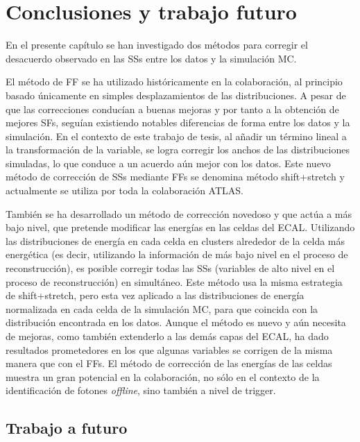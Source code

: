 \section{Conclusiones y trabajo futuro}
\label{sec:ss_corrections:summary}

En el presente capítulo se han investigado dos métodos para corregir el desacuerdo observado en las \acfp{SS} entre los datos y la simulación \ac{MC}.

El método de \acf{FF} se ha utilizado históricamente en la colaboración, al principio basado únicamente en simples desplazamientos de las distribuciones. A pesar de que las correcciones conducían a buenas mejoras y por tanto a la obtención de mejores \acp{SF}, seguían existiendo notables diferencias de forma entre los datos y la simulación. En el contexto de este trabajo de tesis, al añadir un término lineal a la transformación de la variable, se logra corregir los anchos de las distribuciones simuladas, lo que conduce a un acuerdo aún mejor con los datos. Este nuevo método de corrección de \acp{SS} mediante \acp{FF} se denomina método shift+stretch y actualmente se utiliza por toda la colaboración \ac{ATLAS}.

También se ha desarrollado un método de correcci\'on novedoso y que act\'ua a m\'as bajo nivel, que pretende modificar las energías en las celdas del \ac{ECAL}. Utilizando las distribuciones de energía en cada celda en clusters alrededor de la celda más energética (es decir, utilizando la informaci\'on de m\'as bajo nivel en el proceso de reconstrucci\'on), es posible corregir todas las \acp{SS} (variables de alto nivel en el proceso de reconstrucci\'on) en simult\'aneo. Este método usa la misma estrategia de shift+stretch, pero esta vez aplicado a las distribuciones de energ\'ia normalizada en cada celda de la simulación \ac{MC}, para que coincida con la distribución encontrada en los datos. Aunque el método es nuevo y aún necesita de mejoras, como tambi\'en extenderlo a las dem\'as capas del \ac{ECAL}, ha dado resultados prometedores en los que algunas variables se corrigen de la misma manera que con el \acp{FF}. El método de correcci\'on de las energ\'ias de las celdas muestra un gran potencial en la colaboración, no sólo en el contexto de la identificación de fotones \textit{offline}, sino también a nivel de trigger.

\subsection{Trabajo a futuro}

